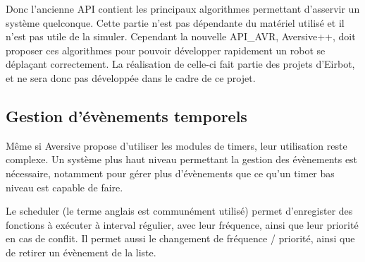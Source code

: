 Donc l'ancienne API contient les principaux algorithmes permettant d'asservir un système quelconque. Cette partie n'est pas dépendante du matériel utilisé et il n'est pas utile de la simuler. 
Cependant la nouvelle API_AVR, Aversive++,  doit proposer ces algorithmes pour pouvoir développer rapidement un robot se déplaçant correctement. La réalisation de celle-ci fait partie des projets d'Eirbot, et ne sera donc pas développée dans le cadre de ce projet.


\subsection{Gestion d'évènements temporels}

Même si Aversive propose d'utiliser les modules de timers, leur utilisation reste complexe. Un système plus haut niveau permettant la gestion des évènements est nécessaire, notamment pour gérer plus d'évènements que ce qu'un timer bas niveau est capable de faire.

Le scheduler (le terme anglais est communément utilisé) permet d'enregister des fonctions à exécuter à interval régulier, avec leur fréquence, ainsi que leur priorité en cas de conflit. Il permet aussi le changement de fréquence / priorité, ainsi que de retirer un évènement de la liste.
\clearpage
